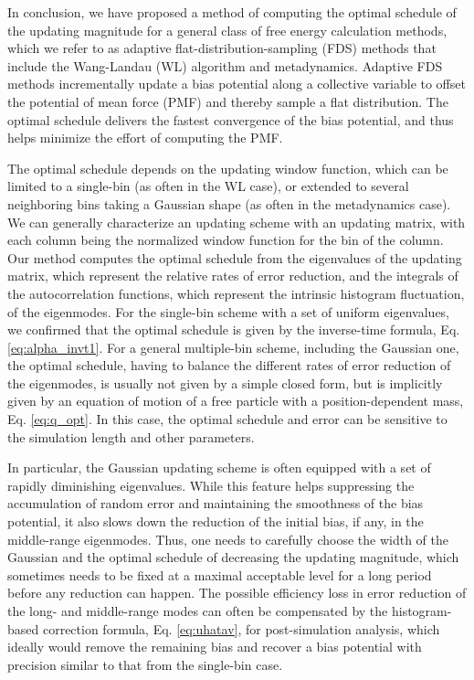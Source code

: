 \documentclass[reprint, superscriptaddress, floatfix]{revtex4-1}
\begin{document}
In conclusion,
we have proposed a method of computing
the optimal schedule of the updating magnitude
for a general class of free energy calculation methods,
which we refer to as adaptive flat-distribution-sampling (FDS) methods
that include the Wang-Landau (WL) algorithm and metadynamics.
%
Adaptive FDS methods
incrementally update a bias potential
along a collective variable
to offset the potential of mean force (PMF)
and thereby sample a flat distribution.
%
The optimal schedule delivers the fastest convergence
of the bias potential,
and thus helps minimize the effort
of computing the PMF.


The optimal schedule depends on the updating window function,
which can be limited to a single-bin (as often in the WL case),
or extended to several neighboring bins
taking a Gaussian shape (as often in the metadynamics case).
%
We can generally characterize
an updating scheme with an updating matrix,
with each column being the normalized
window function for the bin of the column.
%
Our method computes the optimal schedule from
the eigenvalues of the updating matrix,
which represent the relative rates of error reduction,
and the integrals of the autocorrelation functions,
which represent the intrinsic histogram fluctuation,
of the eigenmodes.
%
For the single-bin scheme with a set of uniform eigenvalues,
we confirmed that the optimal schedule
is given by the inverse-time formula,
Eq. \eqref{eq:alpha_invt1}.
%
For a general multiple-bin scheme,
including the Gaussian one,
the optimal schedule, having to balance
the different rates of error reduction of the eigenmodes,
is usually not given by a simple closed form,
but is implicitly given by an equation of motion
of a free particle with a position-dependent mass,
Eq. \eqref{eq:q_opt}.
%
In this case,
the optimal schedule and error
can be sensitive to the simulation length
and other parameters.

In particular, the Gaussian updating scheme is often
equipped with a set of rapidly diminishing eigenvalues.
%
While this feature helps suppressing
the accumulation of random error and
maintaining the smoothness of the bias potential,
it also slows down the reduction
of the initial bias, if any,
in the middle-range eigenmodes.
%
Thus, one needs to carefully choose the width of the Gaussian
and the optimal schedule of decreasing the updating magnitude,
which sometimes needs to be fixed at a maximal acceptable level
for a long period before any reduction can happen.
%
The possible efficiency loss in
error reduction of the long- and middle-range modes
can often be compensated
by the histogram-based correction formula, Eq. \eqref{eq:uhatav},
for post-simulation analysis,
which ideally would remove the remaining bias
and recover a bias potential with precision
similar to that from the single-bin case.
\end{document}
